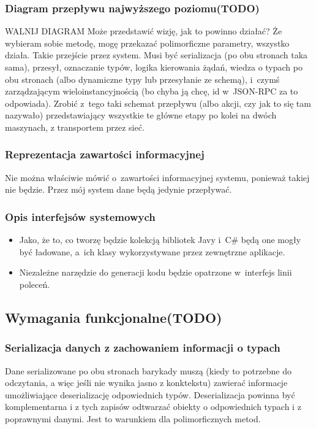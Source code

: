 \subsubsection{Diagram przepływu najwyższego poziomu(TODO)}
WALNIJ DIAGRAM
Może przedstawić wizję, jak to powinno działać? Że wybieram sobie metodę, mogę przekazać polimorficzne parametry, wszystko działa. Takie przejście przez system.
Musi być serializacja (po obu stronach taka sama), przesył, oznaczanie typów, logika kierowania żądań, wiedza o typach po obu stronach (albo dynamiczne typy lub przesyłanie ze schemą), i~czymś zarządzającym wieloinstancyjnością (bo chyba ją chcę, id w~JSON-RPC za to odpowiada).
Zrobić z~tego taki schemat przepływu (albo akcji, czy jak to się tam nazywało) przedstawiający wszystkie te główne etapy po kolei na dwóch maszynach, z transportem przez sieć.

\subsubsection{Reprezentacja zawartości informacyjnej}
Nie można właściwie mówić o~zawartości informacyjnej systemu, ponieważ takiej nie będzie.
Przez mój system dane będą jedynie przepływać.


\subsubsection{Opis interfejsów systemowych}
\begin{itemize}
	\item Jako, że to, co tworzę będzie kolekcją bibliotek Javy i~C\# będą one mogły być ładowane, a~ich klasy wykorzystywane przez zewnętrzne aplikacje.
	\item Niezależne narzędzie do generacji kodu będzie opatrzone w~interfejs linii poleceń.
\end{itemize}


\subsection{Wymagania funkcjonalne(TODO)}

\subsubsection{Serializacja danych z zachowaniem informacji o typach}
Dane serializowane po obu stronach barykady muszą (kiedy to potrzebne do odczytania, a więc jeśli nie wynika jasno z konktekstu) zawierać informacje umożliwiające deserializację odpowiednich typów.
Deserializacja powinna być komplementarna i z tych zapisów odtwarzać obiekty o odpowiednich typach i z poprawnymi danymi.
Jest to warunkiem dla polimorficznych metod.

